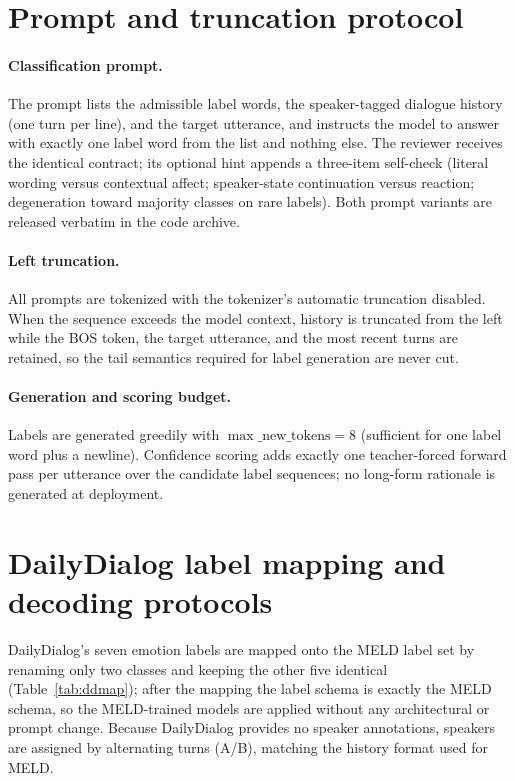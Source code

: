 \documentclass[final,5p,times,twocolumn]{elsarticle}
\begin{document}
\appendix
\section{Prompt and truncation protocol}
\label{app:prompts}
\paragraph{Classification prompt.}
The prompt lists the admissible label words, the speaker-tagged dialogue
history (one turn per line), and the target utterance, and instructs the model
to answer with exactly one label word from the list and nothing else. The
reviewer receives the identical contract; its optional hint appends a
three-item self-check (literal wording versus contextual affect; speaker-state
continuation versus reaction; degeneration toward majority classes on rare
labels). Both prompt variants are released verbatim in the code archive.
\paragraph{Left truncation.}
All prompts are tokenized with the tokenizer's automatic truncation disabled.
When the sequence exceeds the model context, history is truncated from the left
while the BOS token, the target utterance, and the most recent turns are
retained, so the tail semantics required for label generation are never cut.
\paragraph{Generation and scoring budget.}
Labels are generated greedily with $\max\_\text{new\_tokens}{=}8$ (sufficient
for one label word plus a newline). Confidence scoring adds exactly one
teacher-forced forward pass per utterance over the candidate label sequences;
no long-form rationale is generated at deployment.

\section{DailyDialog label mapping and decoding protocols}
\label{app:dailydialog}
DailyDialog's seven emotion labels are mapped onto the MELD label set by
renaming only two classes and keeping the other five identical
(Table~\ref{tab:ddmap}); after the mapping the label schema is exactly the
MELD schema, so the MELD-trained models are applied without any
architectural or prompt change. Because DailyDialog provides no speaker
annotations, speakers are assigned by alternating turns (A/B), matching the
history format used for MELD.
\end{document}

